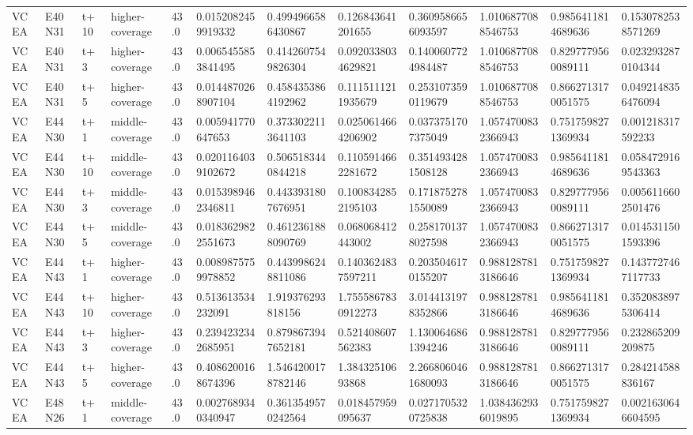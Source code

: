 \begin{landscape}
\begin{longtable}{llllllllllll}
VCEA & E40N31 & t+10 & higher-coverage & 43.0 & 0.0152082459919332 & 0.4994966586430867 & 0.126843641201655 & 0.3609586656093597 & 1.0106877088546753 & 0.9856411814689636 & 0.1530782538571269 \\
VCEA & E40N31 & t+3 & higher-coverage & 43.0 & 0.0065455853841495 & 0.4142607549826304 & 0.0920338034629821 & 0.1400607724984487 & 1.0106877088546753 & 0.8297779560089111 & 0.0232932870104344 \\
VCEA & E40N31 & t+5 & higher-coverage & 43.0 & 0.0144870268907104 & 0.4584353864192962 & 0.1115111211935679 & 0.2531073590119679 & 1.0106877088546753 & 0.8662713170051575 & 0.0492148356476094 \\
VCEA & E44N30 & t+1 & middle-coverage & 43.0 & 0.005941770647653 & 0.3733022113641103 & 0.0250614664206902 & 0.0373751707375049 & 1.0574700832366943 & 0.7517598271369934 & 0.001218317592233 \\
VCEA & E44N30 & t+10 & middle-coverage & 43.0 & 0.0201164039102672 & 0.5065183440844218 & 0.1105914662281672 & 0.3514934281508128 & 1.0574700832366943 & 0.9856411814689636 & 0.0584729169543363 \\
VCEA & E44N30 & t+3 & middle-coverage & 43.0 & 0.0153989462346811 & 0.4433931807676951 & 0.1008342852195103 & 0.1718752781550089 & 1.0574700832366943 & 0.8297779560089111 & 0.0056116602501476 \\
VCEA & E44N30 & t+5 & middle-coverage & 43.0 & 0.0183629822551673 & 0.4612361888090769 & 0.068068412443002 & 0.2581701378027598 & 1.0574700832366943 & 0.8662713170051575 & 0.0145311501593396 \\
VCEA & E44N43 & t+1 & higher-coverage & 43.0 & 0.0089875759978852 & 0.4439986248811086 & 0.1403624837597211 & 0.2035046170155207 & 0.9881287813186646 & 0.7517598271369934 & 0.1437727467117733 \\
VCEA & E44N43 & t+10 & higher-coverage & 43.0 & 0.513613534232091 & 1.919376293818156 & 1.7555867830912273 & 3.0144131978352866 & 0.9881287813186646 & 0.9856411814689636 & 0.3520838975306414 \\
VCEA & E44N43 & t+3 & higher-coverage & 43.0 & 0.2394232342685951 & 0.8798673947652181 & 0.521408607562383 & 1.1300646861394246 & 0.9881287813186646 & 0.8297779560089111 & 0.232865209209875 \\
VCEA & E44N43 & t+5 & higher-coverage & 43.0 & 0.4086200168674396 & 1.5464200178782146 & 1.38432510693868 & 2.2668060461680093 & 0.9881287813186646 & 0.8662713170051575 & 0.284214588836167 \\
VCEA & E48N26 & t+1 & middle-coverage & 43.0 & 0.0027689340340947 & 0.3613549570242564 & 0.018457959095637 & 0.0271705320725838 & 1.0384362936019895 & 0.7517598271369934 & 0.0021630646604595 \\

\end{longtable}
\end{landscape}
